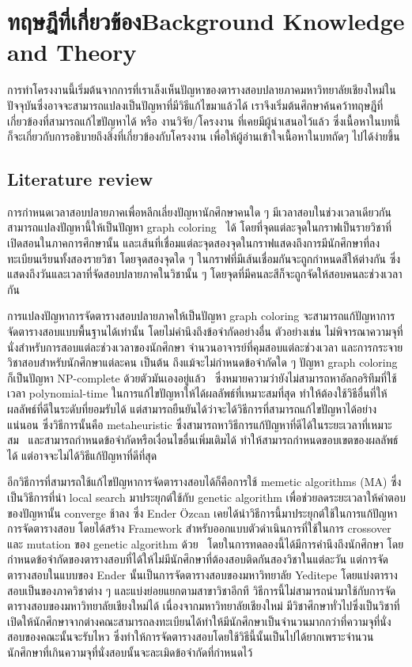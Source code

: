 \chapter{\ifcpe ทฤษฎีที่เกี่ยวข้อง\else Background Knowledge and Theory\fi}

การทำโครงงานนี้เริ่มต้นจากการที่เราเล็งเห็นปัญหาของตารางสอบปลายภาคมหาวิทยาลัยเชียงใหม่ในปัจจุบันซึ่งอาจจะสามารถแปลงเป็นปัญหาที่มีวิธีแก้ไขมาแล้วได้ เราจึงเริ่มต้นศึกษาค้นคว้าทฤษฎีที่เกี่ยวข้องที่สามารถแก้ไขปัญหาได้ หรือ งานวิจัย/โครงงาน ที่เคยมีผู้นำเสนอไว้แล้ว
ซึ่งเนื้อหาในบทนี้ก็จะเกี่ยวกับการอธิบายถึงสิ่งที่เกี่ยวข้องกับโครงงาน เพื่อให้ผู้อ่านเข้าใจเนื้อหาในบทถัดๆ ไปได้ง่ายขึ้น
\section{Literature review}
การกำหนดเวลาสอบปลายภาคเพื่อหลีกเลี่ยงปัญหานักศึกษาคนใด ๆ มีเวลาสอบในช่วงเวลาเดียวกันสามารถแปลงปัญหานี้ให้เป็นปัญหา graph coloring~\cite{mcs} ได้ 
โดยที่จุดแต่ละจุดในกราฟเป็นรายวิชาที่เปิดสอนในภาคการศึกษานั้น 
และเส้นที่เชื่อมแต่ละจุดสองจุดในกราฟแสดงถึงการมีนักศึกษาที่ลงทะเบียนเรียนทั้งสองรายวิชา โดยจุดสองจุดใด ๆ ในกราฟที่มีเส้นเชื่อมกันจะถูกกำหนดสีให้ต่างกัน
ซึ่งแสดงถึงวันและเวลาที่จัดสอบปลายภาคในวิชานั้น ๆ โดยจุดที่มีคนละสีก็จะถูกจัดให้สอบคนละช่วงเวลากัน

การแปลงปัญหาการจัดตารางสอบปลายภาคให้เป็นปัญหา graph coloring จะสามารถแก้ปัญหาการจัดตารางสอบแบบพื้นฐานได้เท่านั้น โดยไม่คำนึงถึงข้อจำกัดอย่างอื่น 
ตัวอย่างเช่น ไม่พิจารณาความจุที่นั่งสำหรับการสอบแต่ละช่วงเวลาของนักศึกษา จำนวนอาจารย์ที่คุมสอบแต่ละช่วงเวลา และการกระจายวิชาสอบสำหรับนักศึกษาแต่ละคน เป็นต้น
ถึงแม้จะไม่กำหนดข้อจำกัดใด ๆ ปัญหา graph coloring ก็เป็นปัญหา NP-complete ด้วยตัวมันเองอยู่แล้ว~\cite{alg-design} 
ซึ่งหมายความว่ายังไม่สามารถหาอัลกอริทึมที่ใช้เวลา polynomial-time ในการแก้ไขปัญหาให้ได้ผลลัพธ์ที่เหมาะสมที่สุด 
ทำให้ต้องใช้วิธีอื่นที่ให้ผลลัพธ์ที่ดีในระดับที่ยอมรับได้ แต่สามารถยืนยันได้ว่าจะได้วิธีการที่สามารถแก้ไขปัญหาได้อย่างแน่นอน 
ซึ่งวิธีการนั้นคือ metaheuristic ซึ่งสามารถหาวิธีการแก้ปัญหาที่ดีได้ในระยะเวลาที่เหมาะสม~\cite{meta-for-vertexcolor}
และสามารถกำหนดข้อจำกัดหรือเงื่อนไขอื่นเพิ่มเติมได้ ทำให้สามารถกำหนดขอบเขตของผลลัพธ์ได้ แต่อาจจะไม่ได้วิธีแก้ปัญหาที่ดีที่สุด

อีกวิธีการที่สามารถใช้แก้ไขปัญหาการจัดตารางสอบได้ก็คือการใช้ memetic algorithms (MA) ซึ่งเป็นวิธีการที่นำ local search มาประยุกต์ใช้กับ genetic algorithm 
เพื่อช่วยลดระยะเวลาให้คำตอบของปัญหานั้น converge ช้าลง \cite{pablo-memetic-algo} ซึ่ง Ender {\"O}zcan เคยได้นำวิธีการนี้มาประยุกต์ใช้ในการแก้ปัญหาการจัดตารางสอบ 
โดยได้สร้าง Framework สำหรับออกแบบตัวดำเนินการที่ใช้ในการ crossover และ mutation ของ genetic algorithm ด้วย~\cite{fes}
โดยในการทดลองนี้ได้มีการคำนึงถึงนักศึกษา โดยกำหนดข้อจำกัดของตารางสอบที่ได้ให้ไม่มีนักศึกษาที่ต้องสอบติดกันสองวิชาในแต่ละวัน แต่การจัดตารางสอบในแบบของ Ender 
นั้นเป็นการจัดตารางสอบของมหาวิทยาลัย Yeditepe โดยแบ่งตารางสอบเป็นของภาควิชาต่าง ๆ และแบ่งย่อยแยกตามสาขาวิชาอีกที วิธีการนี้ไม่สามารถนำมาใช้กับการจัดตารางสอบของมหาวิทยาลัยเชียงใหม่ได้
เนื่องจากมหาวิทยาลัยเชียงใหม่ มีวิชาศึกษาทั่วไปซึ่งเป็นวิชาที่เปิดให้นักศึกษาจากต่างคณะสามารถลงทะเบียนได้ทำให้มีนักศึกษาเป็นจำนวนมากกว่าที่ความจุที่นั่งสอบของคณะนั้นจะรับไหว
ซึ่งทำให้การจัดตารางสอบโดยใช้วิธีนี้นั้นเป็นไปได้ยากเพราะจำนวนนักศึกษาที่เกินความจุที่นั่งสอบนั้นจะละเมิดข้อจำกัดที่กำหนดไว้ 
